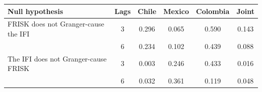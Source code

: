 \begin{tabular}{@{} l c cccc @{}}
\toprule
\textbf{Null hypothesis} & \textbf{Lags} & \textbf{Chile} & \textbf{Mexico} & \textbf{Colombia} & \textbf{Joint} \\
\midrule
FRISK does not Granger-cause the IFI & 3 & 0.296 & 0.065 & 0.590 & 0.143 \\
 & 6 & 0.234 & 0.102 & 0.439 & 0.088 \\
\addlinespace
The IFI does not Granger-cause FRISK & 3 & 0.003 & 0.246 & 0.433 & 0.016 \\
 & 6 & 0.032 & 0.361 & 0.119 & 0.048 \\
\bottomrule
\end{tabular}